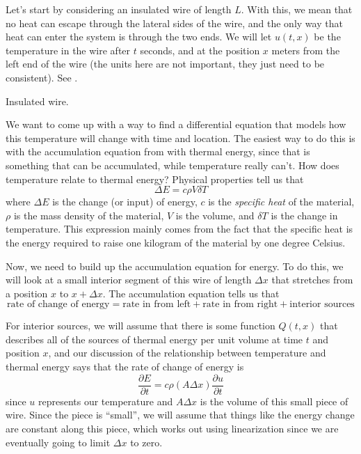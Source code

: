 \documentclass{ximera}
\begin{document}
Let's start by considering an insulated wire of length $L$. With this, we mean that no heat can escape through the lateral sides of the wire, and the only way that heat can enter the system is through the two ends. We will let $u(t,x)$ be the temperature in the wire after $t$ seconds, and at the position $x$ meters from the left end of the wire (the units here are not important, they just need to be consistent). See .

\begin{myfig}
    \capstart
    
    \caption{Insulated wire.\label{heat:wirefig}}
\end{myfig}

We want to come up with a way to find a differential equation that models how this temperature will change with time and location. The easiest way to do this is with the accumulation equation from  with thermal energy, since that is something that can be accumulated, while temperature really can't. How does temperature relate to thermal energy? Physical properties tell us that 
\[ 
    \Delta E = c \rho V \delta T 
\] 
where $\Delta E$ is the change (or input) of energy, $c$ is the \emph{specific heat} of the material, $\rho$ is the mass density of the material, $V$ is the volume, and $\delta T$ is the change in temperature. This expression mainly comes from the fact that the specific heat is the energy required to raise one kilogram of the material by one degree Celsius.

Now, we need to build up the accumulation equation for energy. To do this, we will look at a small interior segment of this wire of length $\Delta x$ that stretches from a position $x$ to $x + \Delta x$. The accumulation equation tells us that
\[ 
    \text{rate of change of energy} = \text{rate in from left} + \text{rate in from right} + \text{interior sources} 
\] 

For interior sources, we will assume that there is some function $Q(t,x)$ that describes all of the sources of thermal energy per unit volume at time $t$ and position $x$, and our discussion of the relationship between temperature and thermal energy says that the rate of change of energy is
\[ 
    \frac{\partial E}{\partial t} = c\rho (A\Delta x)\frac{\partial u}{\partial t} 
\] 
since $u$ represents our temperature and $A\Delta x$ is the volume of this small piece of wire. Since the piece is ``small'', we will assume that things like the energy change are constant along this piece, which works out using linearization since we are eventually going to limit $\Delta x$ to zero. 
\end{document}
